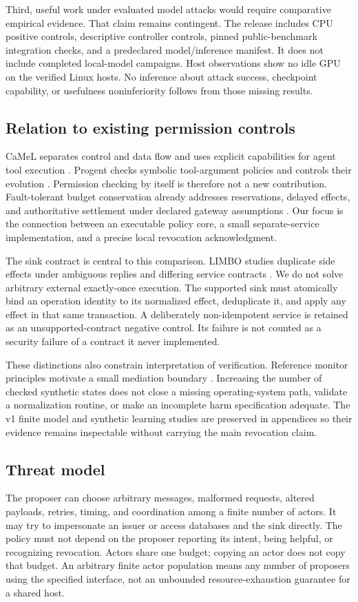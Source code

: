 Third, useful work under evaluated model attacks would require comparative
empirical evidence. That claim remains contingent. The release includes CPU
positive controls, descriptive controller controls, pinned public-benchmark
integration checks, and a predeclared model/inference manifest. It does not
include completed local-model campaigns. Host observations show no idle GPU on
the verified Linux hosts. No inference about attack success, checkpoint
capability, or usefulness noninferiority follows from those missing results.

\subsection{Relation to existing permission controls}
CaMeL separates control and data flow and uses explicit capabilities for agent
tool execution \cite{camel}. Progent checks symbolic tool-argument policies and
controls their evolution \cite{progent}. Permission checking by itself is
therefore not a new contribution. Fault-tolerant budget conservation already
addresses reservations, delayed effects, and authoritative settlement under
declared gateway assumptions \cite{ftbudget}. Our focus is the connection between
an executable policy core, a small separate-service implementation, and a
precise local revocation acknowledgment.

The sink contract is central to this comparison. LIMBO studies duplicate side
effects under ambiguous replies and differing service contracts \cite{limbo}.
We do not solve arbitrary external exactly-once execution. The supported sink
must atomically bind an operation identity to its normalized effect, deduplicate
it, and apply any effect in that same transaction. A deliberately non-idempotent
service is retained as an unsupported-contract negative control. Its failure is
not counted as a security failure of a contract it never implemented.

These distinctions also constrain interpretation of verification. Reference
monitor principles motivate a small mediation boundary \cite{saltzer,schneider}.
Increasing the number of checked synthetic states does not close a missing
operating-system path, validate a normalization routine, or make an incomplete
harm specification adequate. The v1 finite model and synthetic learning studies
are preserved in appendices so their evidence remains inspectable without
carrying the main revocation claim.

\subsection{Threat model}
The proposer can choose arbitrary messages, malformed requests, altered
payloads, retries, timing, and coordination among a finite number of actors.
It may try to impersonate an issuer or access databases and the sink directly.
The policy must not depend on the proposer reporting its intent, being helpful,
or recognizing revocation. Actors share one budget; copying an actor does not
copy that budget. An arbitrary finite actor population means any number of
proposers using the specified interface, not an unbounded resource-exhaustion
guarantee for a shared host.

